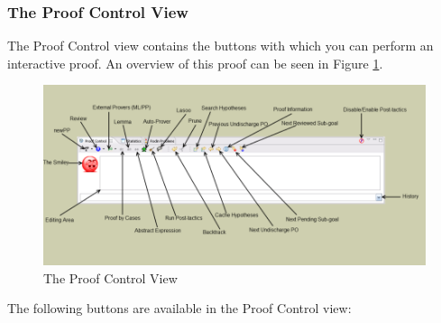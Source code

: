 \subsubsection{The Proof Control View}
\label{proof_control_view}

The \textsf{Proof Control} view contains the buttons with which you can perform an interactive proof. An overview of this proof can be seen in Figure \ref{fig_ref_01_proving_perspective6}.

\begin{figure}[!ht]
\begin{center}
	\includegraphics{img/reference/ref_01_proving_perspective6.png}
	\caption{The Proof Control View}
	\label{fig_ref_01_proving_perspective6}
\end{center}
\end{figure}

The following buttons are available in the \textsf{Proof Control} view:

